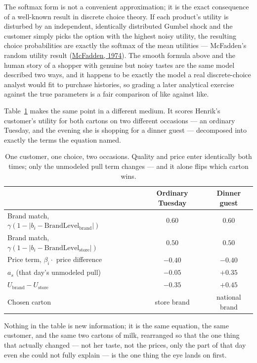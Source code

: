 \documentclass[12pt,a4paper]{article}
\begin{document}
The softmax form is not a convenient approximation; it is the exact
consequence of a well-known result in discrete choice theory. If each
product's utility is disturbed by an independent, identically
distributed Gumbel shock and the customer simply picks the option with
the highest noisy utility, the resulting choice probabilities are
exactly the softmax of the mean utilities --- McFadden's random utility
result (\hyperlink{ref:mcfadden1974}{McFadden, 1974}). The smooth
formula above and the human story of a shopper with genuine but noisy
tastes are the same model described two ways, and it happens to be
exactly the model a real discrete-choice analyst would fit to purchase
histories, so grading a later analytical exercise against the true
parameters is a fair comparison of like against like.

Table~\ref{tab:milk} makes the same point in a different medium. It
scores Henrik's customer's utility for both cartons on two different
occasions --- an ordinary Tuesday, and the evening she is shopping for a
dinner guest --- decomposed into exactly the terms the equation named.

\begin{table}[htbp]
\centering
\begin{tabular}{lcc}
\toprule
& Ordinary Tuesday & Dinner guest \\
\midrule
Brand match, $\gamma(1-|b_i - \text{BrandLevel}_{\text{brand}}|)$ & $0.60$ & $0.60$ \\
Brand match, $\gamma(1-|b_i - \text{BrandLevel}_{\text{store}}|)$ & $0.50$ & $0.50$ \\
Price term, $\beta_i \cdot$ price difference & $-0.40$ & $-0.40$ \\
$a_s$ (that day's unmodeled pull) & $-0.05$ & $+0.35$ \\
\midrule
$U_{\text{brand}} - U_{\text{store}}$ & $-0.35$ & $+0.45$ \\
Chosen carton & store brand & national brand \\
\bottomrule
\end{tabular}
\caption{One customer, one choice, two occasions. Quality and price
enter identically both times; only the unmodeled pull term changes ---
and it alone flips which carton wins.}
\label{tab:milk}
\end{table}

Nothing in the table is new information; it is the same equation, the
same customer, and the same two cartons of milk, rearranged so that the
one thing that actually changed --- not her taste, not the prices, only
the part of that day even she could not fully explain --- is the one
thing the eye lands on first.
\end{document}
